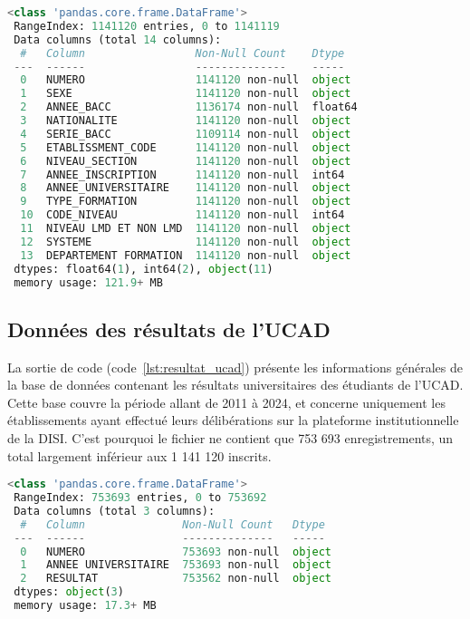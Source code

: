 \begin{lstlisting}[language=Python,
    caption=Info global du data des inscriptions, 
    label=lst:inscription_ucad, 
    basicstyle=\ttfamily\footnotesize, 
    backgroundcolor=\color{gray!10}
]
 <class 'pandas.core.frame.DataFrame'>
 RangeIndex: 1141120 entries, 0 to 1141119
 Data columns (total 14 columns):
  #   Column                 Non-Null Count    Dtype  
 ---  ------                 --------------    -----  
  0   NUMERO                 1141120 non-null  object 
  1   SEXE                   1141120 non-null  object 
  2   ANNEE_BACC             1136174 non-null  float64
  3   NATIONALITE            1141120 non-null  object 
  4   SERIE_BACC             1109114 non-null  object 
  5   ETABLISSMENT_CODE      1141120 non-null  object 
  6   NIVEAU_SECTION         1141120 non-null  object 
  7   ANNEE_INSCRIPTION      1141120 non-null  int64  
  8   ANNEE_UNIVERSITAIRE    1141120 non-null  object 
  9   TYPE_FORMATION         1141120 non-null  object 
  10  CODE_NIVEAU            1141120 non-null  int64  
  11  NIVEAU LMD ET NON LMD  1141120 non-null  object 
  12  SYSTEME                1141120 non-null  object 
  13  DEPARTEMENT FORMATION  1141120 non-null  object 
 dtypes: float64(1), int64(2), object(11)
 memory usage: 121.9+ MB
\end{lstlisting}

\subsection{Données des résultats de l’UCAD}

La sortie de code (code~\ref{lst:resultat_ucad}) présente les informations générales de la base de données contenant les résultats universitaires des étudiants de l’UCAD. 
Cette base couvre la période allant de 2011 à 2024, et concerne uniquement les établissements ayant effectué leurs délibérations sur la plateforme institutionnelle de la DISI. 
C’est pourquoi le fichier ne contient que 753 693 enregistrements, un total largement inférieur aux 1 141 120 inscrits.

\begin{lstlisting}[language=Python,
    caption=Info global du data des résultats, 
    label=lst:resultat_ucad, 
    basicstyle=\ttfamily\footnotesize, 
    backgroundcolor=\color{gray!10}
]
 <class 'pandas.core.frame.DataFrame'>
 RangeIndex: 753693 entries, 0 to 753692
 Data columns (total 3 columns):
  #   Column               Non-Null Count   Dtype 
 ---  ------               --------------   ----- 
  0   NUMERO               753693 non-null  object
  1   ANNEE UNIVERSITAIRE  753693 non-null  object
  2   RESULTAT             753562 non-null  object
 dtypes: object(3)
 memory usage: 17.3+ MB
\end{lstlisting}

